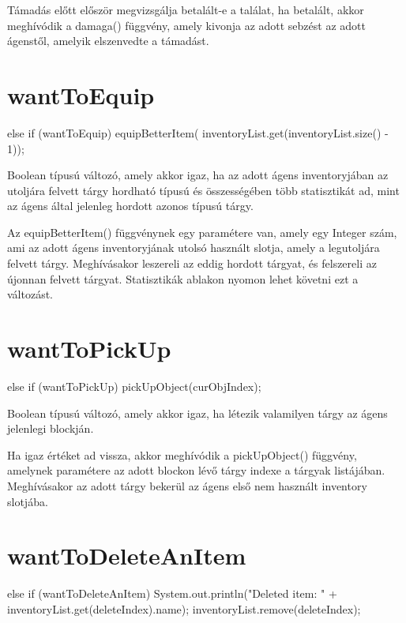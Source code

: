 Támadás előtt először megvizsgálja betalált-e a találat, ha betalált, akkor meghívódik a damaga() függvény, amely
kivonja az adott sebzést az adott ágenstől, amelyik elszenvedte a támadást.

\section{wantToEquip}

\begin{java}
else if (wantToEquip) {			
    equipBetterItem(
        inventoryList.get(inventoryList.size() - 1));
}
\end{java}

Boolean típusú változó, amely akkor igaz, ha az adott ágens inventoryjában az utoljára felvett tárgy hordható
típusú és összességében több statisztikát ad, mint az ágens által jelenleg hordott azonos típusú tárgy.

Az equipBetterItem() függvénynek egy paramétere van, amely egy Integer szám, ami az adott ágens inventoryjának utolsó
használt slotja, amely a legutoljára felvett tárgy. Meghívásakor leszereli az eddig hordott tárgyat, és felszereli az újonnan felvett tárgyat.
Statisztikák ablakon nyomon lehet követni ezt a változást.

\section{wantToPickUp}

\begin{java}
else if (wantToPickUp) {
    pickUpObject(curObjIndex);
}
\end{java}

Boolean típusú változó, amely akkor igaz, ha létezik valamilyen tárgy az ágens jelenlegi blockján.

Ha igaz értéket ad vissza, akkor meghívódik a pickUpObject() függvény, amelynek paramétere az adott blockon lévő tárgy
indexe a tárgyak listájában. Meghívásakor az adott tárgy bekerül az ágens első nem használt inventory slotjába.

\section{wantToDeleteAnItem}

\begin{java}
else if (wantToDeleteAnItem) {
    System.out.println("Deleted item: "
        + inventoryList.get(deleteIndex).name);
    inventoryList.remove(deleteIndex);
}
\end{java}

